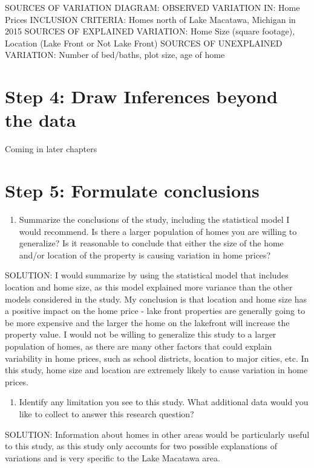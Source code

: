 \documentclass[]{article}
\providecommand{\tightlist}{%
  \setlength{\itemsep}{0pt}\setlength{\parskip}{0pt}}
\begin{document}
SOURCES OF VARIATION DIAGRAM: OBSERVED VARIATION IN: Home Prices
INCLUSION CRITERIA: Homes north of Lake Macatawa, Michigan in 2015
SOURCES OF EXPLAINED VARIATION: Home Size (square footage), Location
(Lake Front or Not Lake Front) SOURCES OF UNEXPLAINED VARIATION: Number
of bed/baths, plot size, age of home

\section{Step 4: Draw Inferences beyond the
data}\label{step-4-draw-inferences-beyond-the-data}

Coming in later chapters

\section{Step 5: Formulate
conclusions}\label{step-5-formulate-conclusions}

\begin{enumerate}
\def\labelenumi{\arabic{enumi}.}
\setcounter{enumi}{16}
\tightlist
\item
  Summarize the conclusions of the study, including the statistical
  model I would recommend. Is there a larger population of homes you are
  willing to generalize? Is it reasonable to conclude that either the
  size of the home and/or location of the property is causing variation
  in home prices?
\end{enumerate}

SOLUTION: I would summarize by using the statistical model that includes
location and home size, as this model explained more variance than the
other models considered in the study. My conclusion is that location and
home size has a positive impact on the home price - lake front
properties are generally going to be more expensive and the larger the
home on the lakefront will increase the property value. I would not be
willing to generalize this study to a larger population of homes, as
there are many other factors that could explain variability in home
prices, such as school districts, location to major cities, etc. In this
study, home size and location are extremely likely to cause variation in
home prices.

\begin{enumerate}
\def\labelenumi{\arabic{enumi}.}
\setcounter{enumi}{17}
\tightlist
\item
  Identify any limitation you see to this study. What additional data
  would you like to collect to answer this research question?
\end{enumerate}

SOLUTION: Information about homes in other areas would be particularly
useful to this study, as this study only accounts for two possible
explanations of variations and is very specific to the Lake Macatawa
area.
\end{document}
